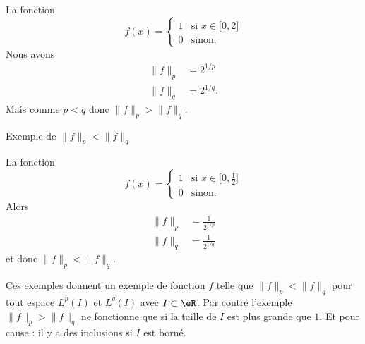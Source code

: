 \begin{subproof}
        La fonction
        \begin{equation}
            f(x)=\begin{cases}
                1    &   \text{si } x\in\mathopen[ 0 , 2 \mathclose]\\
                0    &    \text{sinon.}
            \end{cases}
        \end{equation}
        Nous avons
        \begin{subequations}
            \begin{align}
                \| f \|_p&=2^{1/p}\\
                \| f \|_q&=2^{1/q}.
            \end{align}
        \end{subequations}
        Mais comme \( p<q\) donc \( \| f \|_p>\| f \|_q\).


    \item[Exemple de \( \| f \|_p<\| f \|_q\)]

        La fonction
        \begin{equation}
            f(x)=\begin{cases}
                1    &   \text{si } x\in\mathopen[ 0 , \frac{ 1 }{2} \mathclose]\\
                0    &    \text{sinon.}
            \end{cases}
        \end{equation}
        Alors
        \begin{subequations}
            \begin{align}
                \| f \|_p&=\frac{1}{ 2^{1/p} }\\
                \| f \|_q&=\frac{1}{ 2^{1/q} }
            \end{align}
        \end{subequations}
        et donc \( \| f \|_p<\| f \|_q\).
\end{subproof}

Ces exemples donnent un exemple de fonction \( f\) telle que \( \| f \|_p<\| f \|_q\) pour tout espace \( L^p(I)\) et \( L^q(I)\) avec \( I\subset \eR\). Par contre l'exemple \( \| f \|_p>\| f \|_q\) ne fonctionne que si la taille de \( I\) est plus grande que \( 1\). Et pour cause : il y a des inclusions si \( I\) est borné.

